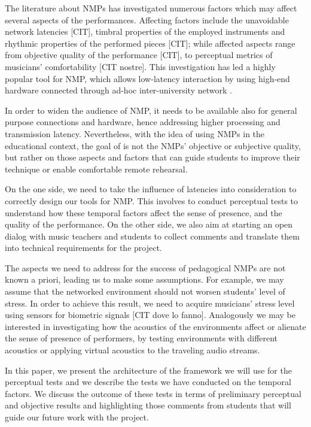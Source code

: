 The literature about NMPs has investigated numerous factors which may affect several aspects of the performances. Affecting factors include the unavoidable network latencies [CIT], timbral properties of the employed instruments and rhythmic properties of the performed pieces [CIT]; while affected aspects range from objective quality of the performance [CIT], to perceptual metrics of musicians' comfortability [CIT nostre]. This investigation has led a highly popular tool for NMP, which allows low-latency interaction by using high-end hardware connected through ad-hoc inter-university network \cite{drioli2013networked}. 

In order to widen the audience of NMP, it needs to be available also for general purpose connections and hardware, hence addressing higher processing and transmission latency. Nevertheless, with the idea of using NMPs in the educational context, the goal of is not the NMPs' objective or subjective quality, but rather on those aspects and factors that can guide students to improve their technique or enable comfortable remote rehearsal. 

On the one side, we need to take the influence of latencies into consideration to correctly design our tools for NMP. This involves to conduct perceptual tests to understand how these temporal factors affect the sense of presence, and the quality of the performance. On the other side, we also aim at starting an open dialog with music teachers and students to collect comments and translate them into technical requirements for the project. 

The aspects we need to address for the success of pedagogical NMPs are not known a priori, leading us to make some assumptions. For example, we may assume that the networked environment should not worsen students' level of stress. In order to achieve this result, we need to acquire musicians' stress level using sensors for biometric signals [CIT dove lo fanno]. Analogously we may be interested in investigating how the acoustics of the environments affect or alienate the sense of presence of performers, by testing environments with different acoustics or applying virtual acoustics to the traveling audio streams.

In this paper, we present the architecture of the framework we will use for the perceptual tests and we describe the tests we have conducted on the temporal factors. We discuss the outcome of these tests in terms of preliminary perceptual and objective results and highlighting those comments from students that will guide our future work with the project.

